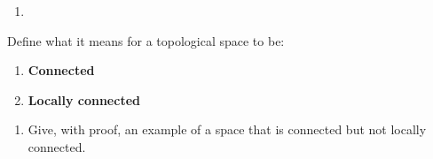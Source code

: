 \begin{problem}[?]

\begin{enumerate}
\def\labelenumi{\alph{enumi}.}
\tightlist
\item
\end{enumerate}

Define what it means for a topological space to be:

\begin{enumerate}
\def\labelenumi{\roman{enumi}.}
\item
  \textbf{Connected}
\item
  \textbf{Locally connected}
\end{enumerate}

\begin{enumerate}
\def\labelenumi{\alph{enumi}.}
\setcounter{enumi}{1}
\tightlist
\item
  Give, with proof, an example of a space that is connected but not
  locally connected.
\end{enumerate}

\end{problem}


